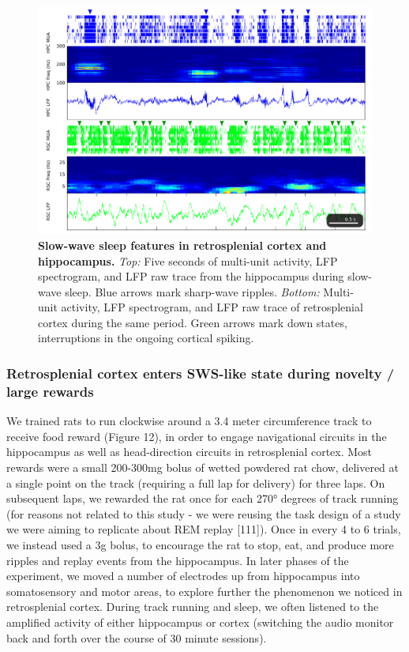 \documentclass[]{article}
\begin{document}
\begin{figure}[htbp]
\centering
\includegraphics{./finalFigs/SWW/exampleSleep.png}
\caption{\textbf{Slow-wave sleep features in retrosplenial cortex and
hippocampus.} \emph{Top:} Five seconds of multi-unit activity, LFP
spectrogram, and LFP raw trace from the hippocampus during slow-wave
sleep. Blue arrows mark sharp-wave ripples. \emph{Bottom:} Multi-unit
activity, LFP spectrogram, and LFP raw trace of retrosplenial cortex
during the same period. Green arrows mark down states, interruptions in
the ongoing cortical spiking.}
\end{figure}

\subsubsection{Retrosplenial cortex enters SWS-like state during novelty
/ large rewards}

We trained rats to run clockwise around a 3.4 meter circumference track
to receive food reward (Figure 12), in order to engage navigational
circuits in the hippocampus as well as head-direction circuits in
retrosplenial cortex. Most rewards were a small 200-300mg bolus of
wetted powdered rat chow, delivered at a single point on the track
(requiring a full lap for delivery) for three laps. On subsequent laps,
we rewarded the rat once for each 270° degrees of track running (for
reasons not related to this study - we were reusing the task design of a
study we were aiming to replicate about REM replay {[}111{]}). Once in
every 4 to 6 trials, we instead used a 3g bolus, to encourage the rat to
stop, eat, and produce more ripples and replay events from the
hippocampus. In later phases of the experiment, we moved a number of
electrodes up from hippocampus into somatosensory and motor areas, to
explore further the phenomenon we noticed in retrosplenial cortex.
During track running and sleep, we often listened to the amplified
activity of either hippocampus or cortex (switching the audio monitor
back and forth over the course of 30 minute sessions).
\end{document}
